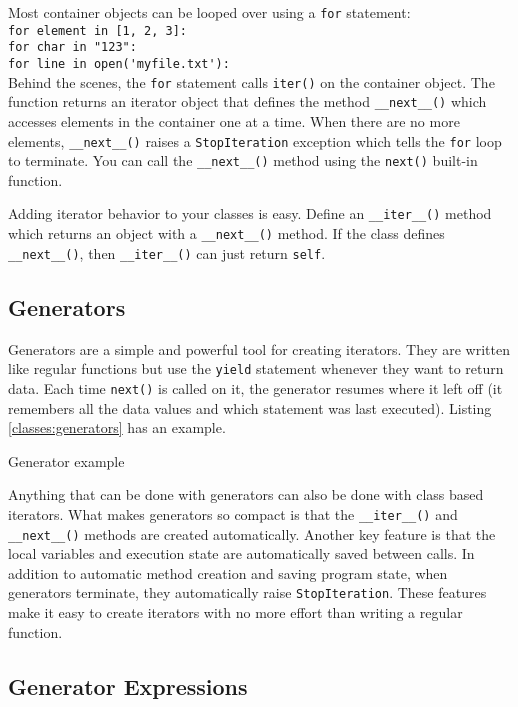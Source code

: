 Most container objects can be looped over using a \verb=for= statement:\\
\verb=for element in [1, 2, 3]:=\\
\verb=for char in "123":=\\
\verb=for line in open('myfile.txt'):=\\
Behind the scenes,
the \verb=for= statement calls \verb=iter()= on the container object.
The function returns an iterator object
that defines the method \verb=__next__()=
which accesses elements in the container one at a time.
When there are no more elements,
\verb=__next__()= raises a \verb=StopIteration= exception
which tells the \verb=for= loop to terminate.
You can call the \verb=__next__()= method
using the \verb=next()= built-in function.

Adding iterator behavior to your classes is easy.
Define an \verb=__iter__()= method
which returns an object with a \verb=__next__()= method.
If the class defines \verb=__next__()=,
then \verb=__iter__()= can just return \verb=self=.


\subsection{Generators}

Generators are a simple and powerful tool for creating iterators.
They are written like regular functions but use the \verb=yield= statement
whenever they want to return data.
Each time \verb=next()= is called on it,
the generator resumes where it left off
(it remembers all the data values and which statement was last executed).
Listing \ref{classes:generators} has an example.

\begin{program}
\caption{Generator example\label{classes:generators}}
\end{program}

Anything that can be done with generators
can also be done with class based iterators.
What makes generators so compact
is that the \verb=__iter__()= and \verb=__next__()= methods
are created automatically.
Another key feature
is that the local variables and execution state
are automatically saved between calls.
In addition to automatic method creation and saving program state,
when generators terminate, they automatically raise \verb=StopIteration=.
These features make it easy to create iterators
with no more effort than writing a regular function.


\subsection{Generator Expressions}

